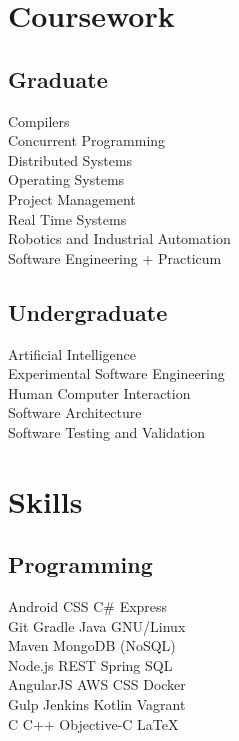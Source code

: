 \documentclass[]{resume}
\begin{document}
\begin{minipage}[t]{0.33\textwidth}
\section{Coursework}
\subsection{Graduate}
Compilers \\
Concurrent Programming \\
Distributed Systems \\
Operating Systems \\
Project Management \\
Real Time Systems \\
Robotics and Industrial Automation \\
Software Engineering + Practicum \\
\sectionsep

\subsection{Undergraduate}
Artificial Intelligence \\
Experimental Software Engineering \\
Human Computer Interaction \\
Software Architecture \\
Software Testing and Validation \\
\sectionsep


\section{Skills}
\subsection{Programming}
Android \textbullet{} CSS \textbullet{} C\# \textbullet{} Express \\
Git \textbullet{} Gradle \textbullet{} Java \textbullet{} GNU/Linux \\
Maven \textbullet{} MongoDB (NoSQL) \\
Node.js \textbullet{} REST \textbullet{} Spring \textbullet{} SQL \\ 
\sectionsep
{}
AngularJS \textbullet{} AWS \textbullet{} CSS \textbullet{} Docker \\
Gulp \textbullet{} Jenkins \textbullet{} Kotlin \textbullet{} Vagrant \\
\sectionsep
{}
C \textbullet{} C++ \textbullet{} Objective-C \textbullet{} \LaTeX\ \\ 
\sectionsep

%
%

\end{minipage} 
\end{document}
